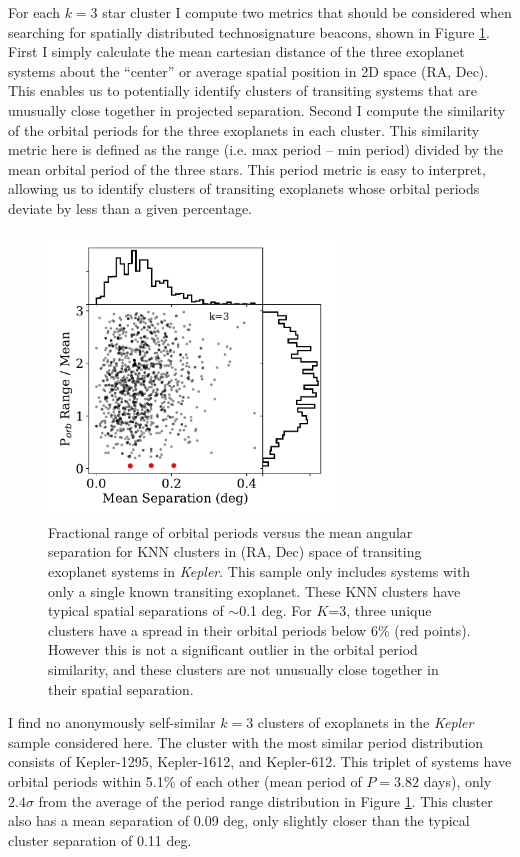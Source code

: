 \documentclass[twocolumn]{aastex62}
\newcommand{\Kepler}{\textsl{Kepler}\xspace}
\begin{document}
For each $k=3$ star cluster I compute two metrics that should be considered when searching for  spatially distributed technosignature beacons, shown in Figure \ref{fig:knn}. First I simply calculate the mean cartesian distance of the three exoplanet systems about the ``center'' or average spatial position in 2D space (RA, Dec). This enables us to potentially identify clusters of transiting systems that are unusually close together in projected separation. Second I compute the similarity of the orbital periods for the three exoplanets in each cluster. This similarity metric here is defined as the range (i.e. max period -- min period) divided by the mean orbital period of the three stars.
This period metric is easy to interpret, allowing us to identify clusters of transiting exoplanets whose orbital periods deviate by less than a given percentage.




\begin{figure}[!t]
\centering
\includegraphics[width=3in]{fig3}
\caption{Fractional range of orbital periods versus the mean angular separation for KNN clusters in (RA, Dec) space of transiting exoplanet systems in \Kepler. This sample only includes systems with only a single known transiting exoplanet. These KNN clusters have typical spatial separations of $\sim$0.1 deg. For $K$=3, three unique clusters have a spread in their orbital periods below 6\% (red points). However this is not a significant outlier in the orbital period similarity, and these clusters are not unusually close together in their spatial separation.}
\label{fig:knn}
\end{figure}


I find no anonymously self-similar $k=3$ clusters of exoplanets in the \Kepler sample considered here. The cluster with the most similar period distribution consists of Kepler-1295, Kepler-1612, and Kepler-612. This triplet of systems have orbital periods within 5.1\% of each other (mean period of $P=3.82$ days), only $2.4\sigma$ from the average of the period range distribution in Figure \ref{fig:knn}.
This cluster also has a mean separation of 0.09 deg, only slightly closer than the typical cluster separation of 0.11 deg.
\end{document}
